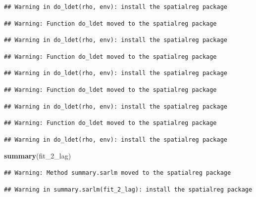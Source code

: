 \documentclass[]{book}
\newenvironment{Shaded}{\begin{snugshade}}{\end{snugshade}}
\newcommand{\DecValTok}[1]{\textcolor[rgb]{0.00,0.00,0.81}{#1}}
\newcommand{\KeywordTok}[1]{\textcolor[rgb]{0.13,0.29,0.53}{\textbf{#1}}}
\newcommand{\NormalTok}[1]{#1}
\begin{document}
\begin{verbatim}
## Warning in do_ldet(rho, env): install the spatialreg package
\end{verbatim}

\begin{verbatim}
## Warning: Function do_ldet moved to the spatialreg package
\end{verbatim}

\begin{verbatim}
## Warning in do_ldet(rho, env): install the spatialreg package
\end{verbatim}

\begin{verbatim}
## Warning: Function do_ldet moved to the spatialreg package
\end{verbatim}

\begin{verbatim}
## Warning in do_ldet(rho, env): install the spatialreg package
\end{verbatim}

\begin{verbatim}
## Warning: Function do_ldet moved to the spatialreg package
\end{verbatim}

\begin{verbatim}
## Warning in do_ldet(rho, env): install the spatialreg package
\end{verbatim}

\begin{verbatim}
## Warning: Function do_ldet moved to the spatialreg package
\end{verbatim}

\begin{verbatim}
## Warning in do_ldet(rho, env): install the spatialreg package
\end{verbatim}

\begin{Shaded}
\begin{Highlighting}[]
\KeywordTok{summary}\NormalTok{(fit_}\DecValTok{2}\NormalTok{_lag)}
\end{Highlighting}
\end{Shaded}

\begin{verbatim}
## Warning: Method summary.sarlm moved to the spatialreg package
\end{verbatim}

\begin{verbatim}
## Warning in summary.sarlm(fit_2_lag): install the spatialreg package
\end{verbatim}
\end{document}
